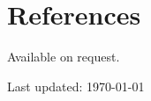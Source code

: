 \documentclass[11pt, a4paper]{article} %
\begin{document}

\section*{References}

Available on request.

\vfill{} %


\begin{center}
{\scriptsize Last updated: \today }%
\end{center}

\end{document}
